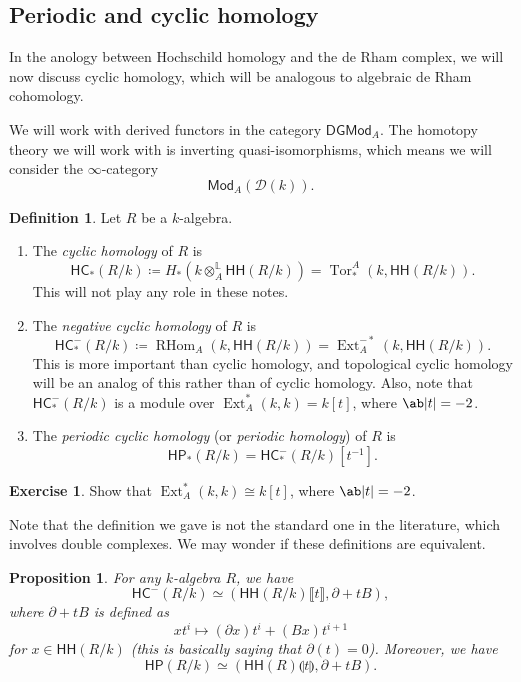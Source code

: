 \documentclass[10pt, oneside]{memoir}
\newtheorem{prop}[thm]{Proposition}
\theoremstyle{definition}
\newtheorem{defn}[thm]{Definition}
\newtheorem{exer}[thm]{Exercise}
\theoremstyle{remark}
\theoremstyle{plain}
\theoremstyle{definition}
\theoremstyle{remark}
\renewcommand{\L}{\mathbb{L}}
\newcommand{\mc}[1]{\mathcal{#1}}
\newcommand{\ms}[1]{\mathsf{#1}}
\newcommand{\1}{\mathbf{1}}
\newcommand{\2}{\mathbf{2}}
\newcommand{\3}{\mathbf{3}}
\newcommand{\ps}[1]{\llbracket #1 \rrbracket}
\newcommand{\ls}[1]{\llparenthesis #1 \rrparenthesis}
\newcommand{\HC}{\ms{HC}}
\newcommand{\HH}{\ms{HH}}
\newcommand{\HP}{\ms{HP}}
\DeclareMathOperator{\Tor}{Tor}
\DeclareMathOperator{\RHom}{RHom}
\DeclareMathOperator{\Ext}{Ext}
\begin{document}
\subsection{Periodic and cyclic homology}%
\label{sub:Periodic and cyclic homology}

In the anology between Hochschild homology and the de Rham complex, we will now discuss cyclic homology, which will be analogous to algebraic de Rham cohomology.

We will work with derived functors in the category $\ms{DGMod}_A$. The homotopy theory we will work with is inverting quasi-isomorphisms, which means we will consider the $\infty$-category
\[ \ms{Mod}_A(\mc{D}(k)). \]

\begin{defn}
    Let $R$ be a $k$-algebra.
    \begin{enumerate}
        \item The \textit{cyclic homology} of $R$ is
        \[ \HC_*(R/k) \coloneqq H_*(k \otimes_A^{\L} \HH(R/k)) = \Tor_*^A(k, \HH(R/k)). \]
        This will not play any role in these notes.
        \item The \textit{negative cyclic homology} of $R$ is
        \[ \HC_*^-(R/k) \coloneqq \RHom_A(k, \HH(R/k)) = \Ext_A^{-*}(k, \HH(R/k)). \]
        This is more important than cyclic homology, and topological cyclic homology will be an analog of this rather than of cyclic homology. Also, note that $\HC_*^-(R/k)$ is a module over $\Ext_A^{*}(k,k) = k[t]$, where $\ab|t| = -2$.
        \item The \textit{periodic cyclic homology} (or \textit{periodic homology}) of $R$ is
        \[ \HP_*(R/k) = \HC_*^-(R/k) [t^{-1}]. \]
    \end{enumerate}
\end{defn}

\begin{exer}
    Show that $\Ext_A^*(k,k) \cong k[t]$, where $\ab|t| = -2$.
\end{exer}

Note that the definition we gave is not the standard one in the literature, which involves double complexes. We may wonder if these definitions are equivalent.

\begin{prop}
    For any $k$-algebra $R$, we have
    \[ \HC^-(R/k) \simeq (\HH(R/k)\ps{t}, \partial + tB), \]
    where $\partial + tB$ is defined as
    \[ xt^i \mapsto (\partial x) t^i + (Bx) t^{i+1} \]
    for $x \in \HH(R/k)$ (this is basically saying that $\partial(t) = 0$). Moreover, we have
    \[ \HP(R/k) \simeq (\HH(R)\ls{t}, \partial + tB). \]
\end{prop}
\end{document}
